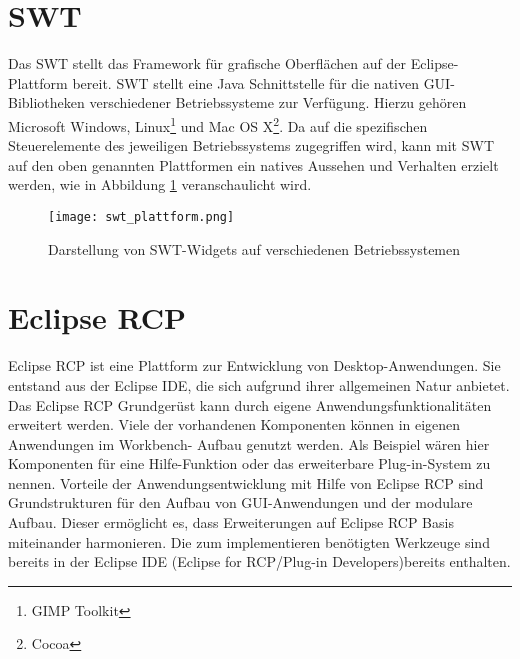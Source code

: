 \section{SWT}{
\label{sec:SWT}
Das \ac{SWT}  stellt das Framework für grafische Oberflächen auf der Eclipse-Plattform bereit. \ac{SWT} stellt eine Java Schnittstelle für die nativen GUI-Bibliotheken verschiedener Betriebssysteme zur Verfügung. Hierzu gehören Microsoft Windows, Linux\footnote{GIMP Toolkit} und Mac OS X\footnote{Cocoa}. Da auf die spezifischen Steuerelemente des jeweiligen Betriebssystems zugegriffen wird, kann mit SWT auf den oben genannten Plattformen ein natives Aussehen und Verhalten erzielt werden, wie in Abbildung \ref{fig:swt_plattform} veranschaulicht wird.


\begin{figure}[htbp] 
  \centering
     \texttt{[image: swt\_plattform.png]}
  \caption{Darstellung von SWT-Widgets auf verschiedenen Betriebssystemen\footnotemark}
   \label{fig:swt_plattform}
\end{figure}




}

\section{Eclipse RCP}{
\label{sec:Eclipse_rcp}
Eclipse \ac{RCP} ist eine Plattform zur Entwicklung von Desktop-Anwendungen. Sie entstand aus der Eclipse \ac{IDE}, die sich aufgrund ihrer allgemeinen Natur anbietet. Das Eclipse \ac{RCP} Grundgerüst kann durch eigene Anwendungsfunktionalitäten erweitert werden. Viele der vorhandenen Komponenten können in eigenen Anwendungen im Workbench- Aufbau genutzt werden. Als Beispiel wären hier Komponenten für eine Hilfe-Funktion oder das erweiterbare Plug-in-System zu nennen. Vorteile der Anwendungsentwicklung mit Hilfe von Eclipse \ac{RCP} sind Grundstrukturen für den Aufbau von GUI-Anwendungen und der modulare Aufbau. Dieser ermöglicht es, dass Erweiterungen auf Eclipse \ac{RCP} Basis miteinander harmonieren. Die zum implementieren benötigten Werkzeuge sind bereits in der Eclipse \ac{IDE} (Eclipse for RCP/Plug-in Developers)bereits enthalten.
}

